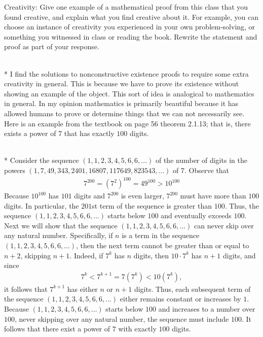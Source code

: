 \documentclass[10pt]{article}
\makeatletter
\newenvironment{answer}[2][Answer]{\begin{trivlist}
\item[\hskip \labelsep {\bfseries #1}\hskip \labelsep {\bfseries #2.}]}{\end{trivlist}}
\newenvironment{question}[2][Question]{\begin{trivlist}
\item[\hskip \labelsep {\bfseries #1}\hskip \labelsep {\bfseries #2.}]}{\end{trivlist}}
\renewenvironment{proof}[1][\proofname]{\par
\pushQED{\qed}
\normalfont \topsep6\p@\@plus6\p@\relax
\trivlist
\item[\hskip\labelsep\itshape#1\@addpunct{.}]\mbox{}\\*}{\popQED\endtrivlist\@endpefalse}
\renewenvironment{answer}[1][Answer]{\par
\normalfont \topsep6\p@\@plus6\p@\relax
\trivlist
\item[\hskip\labelsep\itshape#1\@addpunct{.}]\mbox{}\\*}{\popQED\endtrivlist\@endpefalse}
\makeatother
\begin{document}
\begin{question}{8}
Creativity: Give one example of a mathematical proof from this class that you found creative, and explain what you find creative about it. For example, you can choose an instance of creativity you experienced in your own problem-solving, or something you witnessed in class or reading the book. Rewrite the statement and proof as part of your response.
\begin{answer}
I find the solutions to nonconstructive existence proofs to require some extra creativity in general. This is because we have to prove its existence without showing an example of the object. This sort of idea is analogical to mathematics in general. In my opinion mathematics is primarily beautiful because it has allowed humans to prove or determine things that we can not necessarily see. Here is an example from the textbook on page 56 theorem 2.1.13; that is, there exists a power of $7$ that has exactly $100$ digits.

\begin{proof} 
	Consider the sequence $(1,1,2,3,4,5,6,6,\dots)$ of the number of 
	digits in the powers $(1,7,49,343,2401,16807,117649,823543,\dots)$ of $7$. Observe that
	\begin{align*}
		7^{200} = (7^2)^{100} = 49^{100} > 10^{100}
	\end{align*}
	Because $10^{100}$ has $101$ digits and $7^{200}$ is even larger, $7^{200}$ must have more than $100$ digits. In particular, the $201$st term of the sequence is greater than $100$. Thus, the sequence $(1,1,2,3,4,5,6,6,\dots)$ starts below $100$ and eventually exceeds $100$. \\ \indent Next we will show that the sequence $(1,1,2,3,4,5,6,6,\dots)$ can never skip over any natural number. Specifically, if $n$ is a term in the sequence $(1,1,2,3,4,5,6,6,\dots)$, then the next term cannot be greater than or equal to $n+2$, skipping $n+1$. Indeed, if $7^k$ has $n$ digits, then $10\cdot 7^k$ has $n+1$ digits, and since
	\begin{align*}
		7^k < 7^{k+1} = 7(7^k) < 10(7^k),
	\end{align*}
	it follows that $7^{k+1}$ has either $n$ or $n+1$ digits. Thus, each subsequent term of the sequence $(1,1,2,3,4,5,6,6,\dots)$ either remains constant or increases by $1$. \\
	\indent Because $(1,1,2,3,4,5,6,6,\dots)$  starts below $100$ and increases to a number over $100$, never skipping over any natural number, the sequence must include $100$. It follows that there exist a power of $7$ with exactly $100$ digits.
\end{proof}
\end{answer}
\end{question}
\end{document}
